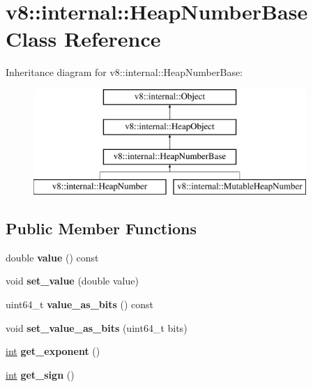 \hypertarget{classv8_1_1internal_1_1HeapNumberBase}{}\section{v8\+:\+:internal\+:\+:Heap\+Number\+Base Class Reference}
\label{classv8_1_1internal_1_1HeapNumberBase}
Inheritance diagram for v8\+:\+:internal\+:\+:Heap\+Number\+Base\+:\begin{figure}[H]
\begin{center}
\leavevmode
\includegraphics[height=4.000000cm]{classv8_1_1internal_1_1HeapNumberBase}
\end{center}
\end{figure}
\subsection*{Public Member Functions}
\begin{DoxyCompactItemize}
\item 
\mbox{\label{classv8_1_1internal_1_1HeapNumberBase_a975a993f5b12dbd32bb4b1ca637559c6}} 
double {\bfseries value} () const
\item 
\mbox{\label{classv8_1_1internal_1_1HeapNumberBase_ac035c918847581ac617b073597e45fbf}} 
void {\bfseries set\+\_\+value} (double value)
\item 
\mbox{\label{classv8_1_1internal_1_1HeapNumberBase_a5ade44b6d58022a1b34e89945a9e4e1c}} 
uint64\+\_\+t {\bfseries value\+\_\+as\+\_\+bits} () const
\item 
\mbox{\label{classv8_1_1internal_1_1HeapNumberBase_ac38230539997a8936014db858e2dfde4}} 
void {\bfseries set\+\_\+value\+\_\+as\+\_\+bits} (uint64\+\_\+t bits)
\item 
\mbox{\label{classv8_1_1internal_1_1HeapNumberBase_afab42639dab79c6aa2b55135292efe1d}} 
\mbox{\hyperlink{classint}{int}} {\bfseries get\+\_\+exponent} ()
\item 
\mbox{\label{classv8_1_1internal_1_1HeapNumberBase_a51e7aec30d5e95cfede1a6f3c92ad98b}} 
\mbox{\hyperlink{classint}{int}} {\bfseries get\+\_\+sign} ()
\end{DoxyCompactItemize}
